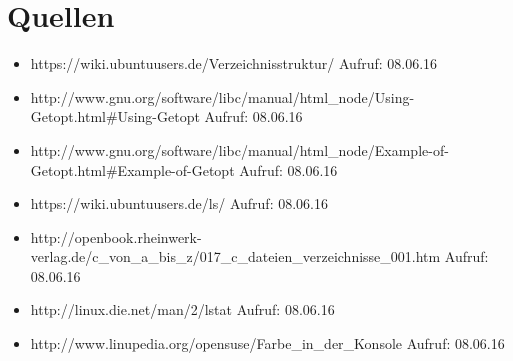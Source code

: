 \section{Quellen}
	\begin{itemize}
		\item https://wiki.ubuntuusers.de/Verzeichnisstruktur/ Aufruf: 08.06.16\\
		\item http://www.gnu.org/software/libc/manual/html\_node/Using-Getopt.html\#Using-Getopt Aufruf: 08.06.16\\
		\item http://www.gnu.org/software/libc/manual/html\_node/Example-of-Getopt.html\#Example-of-Getopt Aufruf: 08.06.16\\
		\item https://wiki.ubuntuusers.de/ls/ Aufruf: 08.06.16\\
		\item http://openbook.rheinwerk-verlag.de/c\_von\_a\_bis\_z/017\_c\_dateien\_verzeichnisse\_001.htm Aufruf: 08.06.16\\
		\item http://linux.die.net/man/2/lstat Aufruf: 08.06.16\\
		\item http://www.linupedia.org/opensuse/Farbe\_in\_der\_Konsole Aufruf: 08.06.16\\
	\end{itemize}